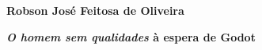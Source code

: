 
\textbf{Robson José Feitosa de Oliveira} \lipsum[1]


\textbf{\emph{O homem sem qualidades} à espera de Godot} \lipsum[1]

